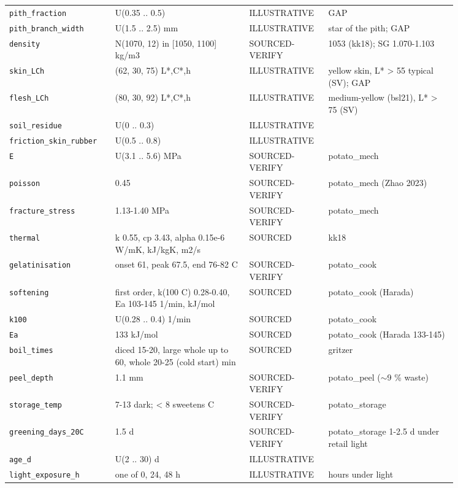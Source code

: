 \documentclass[10.5pt,a4paper]{article}
\begin{document}
{\begin{longtable}{@{}p{0.2\linewidth}p{0.27\linewidth}p{0.12\linewidth}p{0.26\linewidth}@{}}
\texttt{pith\_\allowbreak{}fraction} & U(0.35 .. 0.5) & ILLUSTRATIVE & GAP \\
\texttt{pith\_\allowbreak{}branch\_\allowbreak{}width} & U(1.5 .. 2.5) mm & ILLUSTRATIVE & star of the pith; GAP \\
\texttt{density} & N(1070, 12) in [1050, 1100] kg/m3 & SOURCED-VERIFY & 1053 (kk18); SG 1.070-1.103 \\
\texttt{skin\_\allowbreak{}LCh} & (62, 30, 75) L*,C*,h & ILLUSTRATIVE & yellow skin, L* > 55 typical (SV); GAP \\
\texttt{flesh\_\allowbreak{}LCh} & (80, 30, 92) L*,C*,h & ILLUSTRATIVE & medium-yellow (bsl21), L* > 75 (SV) \\
\texttt{soil\_\allowbreak{}residue} & U(0 .. 0.3) & ILLUSTRATIVE &  \\
\texttt{friction\_\allowbreak{}skin\_\allowbreak{}rubber} & U(0.5 .. 0.8) & ILLUSTRATIVE &  \\
\texttt{E} & U(3.1 .. 5.6) MPa & SOURCED-VERIFY & potato\_mech \\
\texttt{poisson} & 0.45 & SOURCED-VERIFY & potato\_mech (Zhao 2023) \\
\texttt{fracture\_\allowbreak{}stress} & 1.13-1.40 MPa & SOURCED-VERIFY & potato\_mech \\
\texttt{thermal} & k 0.55, cp 3.43, alpha 0.15e-6 W/mK, kJ/kgK, m2/s & SOURCED & kk18 \\
\texttt{gelatinisation} & onset 61, peak 67.5, end 76-82 C & SOURCED-VERIFY & potato\_cook \\
\texttt{softening} & first order, k(100 C) 0.28-0.40, Ea 103-145 1/min, kJ/mol & SOURCED & potato\_cook (Harada) \\
\texttt{k100} & U(0.28 .. 0.4) 1/min & SOURCED & potato\_cook \\
\texttt{Ea} & 133 kJ/mol & SOURCED & potato\_cook (Harada 133-145) \\
\texttt{boil\_\allowbreak{}times} & diced 15-20, large whole up to 60, whole 20-25 (cold start) min & SOURCED & gritzer \\
\texttt{peel\_\allowbreak{}depth} & 1.1 mm & SOURCED-VERIFY & potato\_peel ($\sim$9 \% waste) \\
\texttt{storage\_\allowbreak{}temp} & 7-13 dark; < 8 sweetens C & SOURCED-VERIFY & potato\_storage \\
\texttt{greening\_\allowbreak{}days\_\allowbreak{}20C} & 1.5 d & SOURCED-VERIFY & potato\_storage 1-2.5 d under retail light \\
\texttt{age\_\allowbreak{}d} & U(2 .. 30) d & ILLUSTRATIVE &  \\
\texttt{light\_\allowbreak{}exposure\_\allowbreak{}h} & one of 0, 24, 48 h & ILLUSTRATIVE & hours under light \\\bottomrule\end{longtable}}
\end{document}
